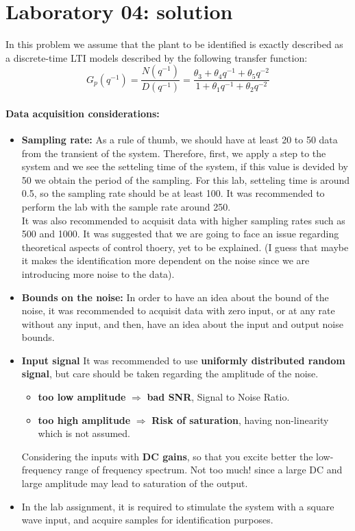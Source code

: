 \chapter{Laboratory 04: solution}
In this problem we assume that the plant to be identified is exactly described as a discrete-time
LTI models described by the following transfer function:
\[
G_p(q^{-1}) = \frac{N(q^{-1})}{D(q^{-1})} = \frac{\theta_3 + \theta_4 q^{-1} + \theta_5 q^{-2}}{1 + \theta_1 q^{-1} + \theta_2 q^{-2}} 
\]
\subsubsection{Data acquisition considerations:}
\begin{itemize}
    \item \textbf{Sampling rate: }As a rule of thumb, we should have at least 20 to 50 data from the transient of the system. Therefore, first, we apply a step to the system and we see the setteling time of the system, if this value is devided by 50 we obtain the period of the sampling. For this lab, setteling time is around 0.5, so the sampling rate should be at least 100. It was recommended to perform the lab with the sample rate around 250. \\
    It was also recommended to acquisit data with higher sampling rates such as 500 and 1000. It was suggested that we are going to face an issue regarding theoretical aspects of control thoery, yet to be explained. (I guess that maybe it makes the identification more dependent on the noise since we are introducing more noise to the data).
    \item \textbf{Bounds on the noise:} In order to have an idea about the bound of the noise, it was recommended to acquisit data with zero input, or at any rate without any input, and then, have an idea about the input and output noise bounds.
    \item \textbf{Input signal} It was recommended to use \textbf{uniformly distributed random signal}, but care should be taken regarding the amplitude of the noise. \begin{itemize}
                \item \textbf{too low amplitude} $\Rightarrow$ \textbf{bad SNR}, Signal to Noise Ratio.
                \item \textbf{too high amplitude} $\Rightarrow$ \textbf{Risk of saturation}, having non-linearity which is not assumed.\\
                \end{itemize}
                
                Considering the inputs with \textbf{DC gains}, so that you excite better the low-frequency range of frequency spectrum. Not too much! since a large DC and large amplitude may lead to saturation of the output. 
     
    \item In the lab assignment, it is required to stimulate the system with a square wave input, and acquire samples for identification purposes.
\end{itemize}

